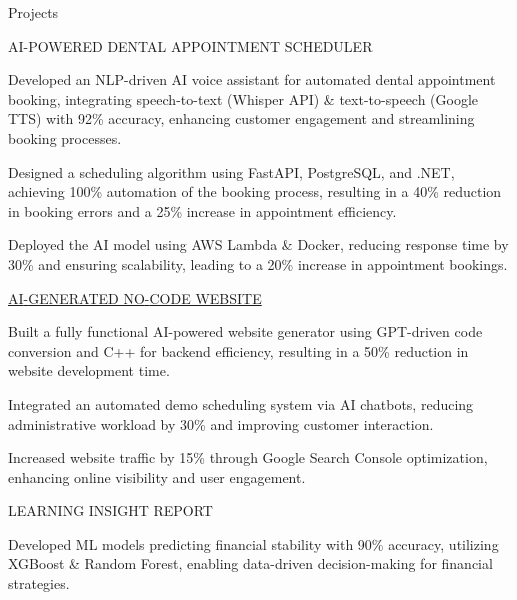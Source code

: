 \documentclass{resume} %
\begin{document}
    \begin{rSection}{Projects}
                    \begin{rSubsection}
                                    {AI{-}POWERED DENTAL APPOINTMENT SCHEDULER}
                                {}{}{}
                                    \item Developed an NLP{-}driven AI voice assistant for automated dental appointment booking, integrating speech{-}to{-}text (Whisper API) \& text{-}to{-}speech (Google TTS) with 92\% accuracy, enhancing customer engagement and streamlining booking processes.
                                    \item Designed a scheduling algorithm using FastAPI, PostgreSQL, and .NET, achieving 100\% automation of the booking process, resulting in a 40\% reduction in booking errors and a 25\% increase in appointment efficiency.
                                    \item Deployed the AI model using AWS Lambda \& Docker, reducing response time by 30\% and ensuring scalability, leading to a 20\% increase in appointment bookings.
                            \end{rSubsection}
                    \begin{rSubsection}
                                    {\href{www.civaroai.com}{AI{-}GENERATED NO{-}CODE WEBSITE}}
                                {}{}{}
                                    \item Built a fully functional AI{-}powered website generator using GPT{-}driven code conversion and C++ for backend efficiency, resulting in a 50\% reduction in website development time.
                                    \item Integrated an automated demo scheduling system via AI chatbots, reducing administrative workload by 30\% and improving customer interaction.
                                    \item Increased website traffic by 15\% through Google Search Console optimization, enhancing online visibility and user engagement.
                            \end{rSubsection}
                    \begin{rSubsection}
                                    {LEARNING INSIGHT REPORT}
                                {}{}{}
                                    \item Developed ML models predicting financial stability with 90\% accuracy, utilizing XGBoost \& Random Forest, enabling data{-}driven decision{-}making for financial strategies.

\end{rSubsection}
\end{rSection}
\end{document}
